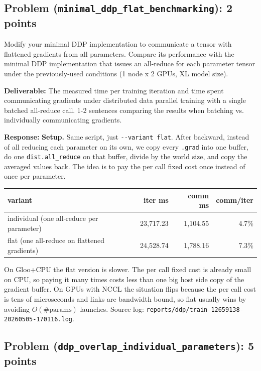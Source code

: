 \documentclass[11pt]{article}
\begin{document}
\subsection*{Problem (\texttt{minimal\_ddp\_flat\_benchmarking}): 2 points}

Modify your minimal DDP implementation to communicate a tensor with flattened gradients from all parameters. Compare its performance with the minimal DDP implementation that issues an all-reduce for each parameter tensor under the previously-used conditions (1 node x 2 GPUs, XL model size).

\textbf{Deliverable:} The measured time per training iteration and time spent communicating gradients under distributed data parallel training with a single batched all-reduce call. 1-2 sentences comparing the results when batching vs. individually communicating gradients.

\textbf{Response:}
\textbf{Setup.} Same script, just \verb|--variant flat|. After backward, instead of all reducing each parameter on its own, we copy every \verb|.grad| into one buffer, do one \verb|dist.all_reduce| on that buffer, divide by the world size, and copy the averaged values back. The idea is to pay the per call fixed cost once instead of once per parameter.

\begin{table}[H]
\centering\small
\begin{tabular}{lrrr}
\toprule
variant & iter ms & comm ms & comm/iter \\
\midrule
individual (one all-reduce per parameter)   & 23{,}717.23 & 1{,}104.55 & 4.7\% \\
flat (one all-reduce on flattened gradients) & 24{,}528.74 & 1{,}788.16 & 7.3\% \\
\bottomrule
\end{tabular}
\end{table}

\noindent On Gloo+CPU the flat version is slower. The per call fixed cost is already small on CPU, so paying it many times costs less than one big host side copy of the gradient buffer. On GPUs with NCCL the situation flips because the per call cost is tens of microseconds and links are bandwidth bound, so flat usually wins by avoiding $O(\#\text{params})$ launches. Source log: \verb|reports/ddp/train-12659138-20260505-170116.log|.

\subsection*{Problem (\texttt{ddp\_overlap\_individual\_parameters}): 5 points}
\end{document}
